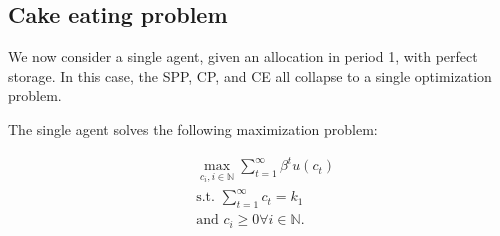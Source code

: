 \documentclass[11pt]{article} %
\begin{document}
\subsection{Cake eating problem}
We now consider a single agent, given an allocation in period 1, with perfect storage. In this case, the SPP, CP, and CE all collapse to a single optimization problem.

The single agent solves the following maximization problem:

\begin{align*}
&\max_{ c_{i}, i \in \mathbb{N}}  \sum_{t=1}^{\infty}\beta^{t} u(c_t)\\
& \text{s.t. } \sum_{t=1}^{\infty} c_t = k_1\\
& \text{and } c_i \geq 0 \forall i \in \mathbb{N}.
\end{align*}
\end{document}
